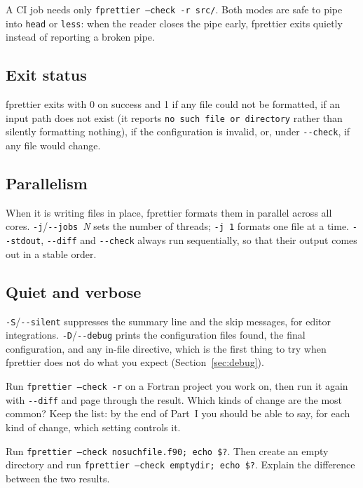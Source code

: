 \documentclass[11pt,a4paper,openany]{book}
\newcommand{\code}[1]{\texttt{\small #1}}
\newcommand{\flag}[1]{\texttt{\small -{}-#1}}
\newcounter{exercise}[chapter]
\begin{document}
A CI job needs only \code{fprettier --check -r src/}. Both modes are safe to
pipe into \code{head} or \code{less}: when the reader closes the pipe early,
fprettier exits quietly instead of reporting a broken pipe.

\subsection{Exit status}

fprettier exits with 0 on success and 1 if any file could not be formatted,
if an input path does not exist (it reports \code{no such file or directory}
rather than silently formatting nothing), if the configuration is invalid, or,
under \flag{check}, if any file would change.

\subsection{Parallelism}

When it is writing files in place, fprettier formats them in parallel across
all cores. \code{-j}/\flag{jobs}~\textit{N} sets the number of threads;
\code{-j 1} formats one file at a time. \flag{stdout}, \flag{diff} and
\flag{check} always run sequentially, so that their output comes out in a
stable order.

\subsection{Quiet and verbose}

\code{-S}/\flag{silent} suppresses the summary line and the skip messages, for
editor integrations. \code{-D}/\flag{debug} prints the configuration files
found, the final configuration, and any in-file directive, which is the first
thing to try when fprettier does not do what you expect
(Section~\ref{sec:debug}).

\begin{exercise}
Run \code{fprettier --check -r} on a Fortran project you work on, then run it
again with \flag{diff} and page through the result. Which kinds of change are
the most common? Keep the list: by the end of Part~I you should be able to say,
for each kind of change, which setting controls it.
\end{exercise}

\begin{exercise}
Run \code{fprettier --check nosuchfile.f90; echo \$?}. Then create an empty
directory and run \code{fprettier --check emptydir; echo \$?}. Explain the
difference between the two results.
\end{exercise}
\end{document}
